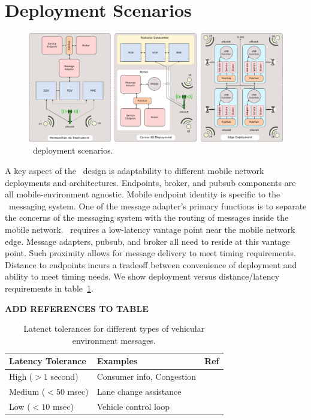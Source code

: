 \section{Deployment Scenarios}
\label{sec:deployments}

\begin{figure}[ht]
  \centering
  \includegraphics[width=\textwidth]{figs/deploy.png}
  \caption{\name~deployment scenarios.}
  \label{fig:deployments}
\end{figure}

A key aspect of the \name~design is adaptability to different mobile
network deployments and architectures. Endpoints, broker, and pubsub
components are all mobile-environment agnostic. Mobile endpoint
identity is specific to the \name~messaging system. One of the message
adapter's primary functions is to separate the concerns of the
messaging system with the routing of messages inside the mobile
network.  \name~requires a low-latency vantage point near the mobile
network edge. Message adapters, pubsub, and broker all need to reside
at this vantage point.  Such proximity allows for message delivery to
meet timing requirements.  Distance to endpoints incurs a tradeoff between
convenience of deployment and ability to meet timing needs. We show
deployment versus distance/latency requirements in
table~\ref{tab:lat-req}.

{\bf ADD REFERENCES TO TABLE}

\begin{table}[h]
  \centering
  \begin{tabular}{| l | l | l |}
    \hline
    \textbf{Latency Tolerance} & \textbf{Examples} & \textbf{Ref} \\ \hline \hline
    High ($> 1$ second) & Consumer info, Congestion & \cite{camp2005vehicle,papadimitratos2009vehicular} \\ \hline
    Medium ($< 50$ msec) & Lane change assistance & \cite{FIXME} \\ \hline
    Low ($< 10$ msec) & Vehicle control loop & \cite{hansson2002integrating} \\ \hline
    \hline
  \end{tabular}
  \label{tab:lat-req}
  \caption{Latenct tolerances for different types of vehicular environment messages.}
\end{table}

